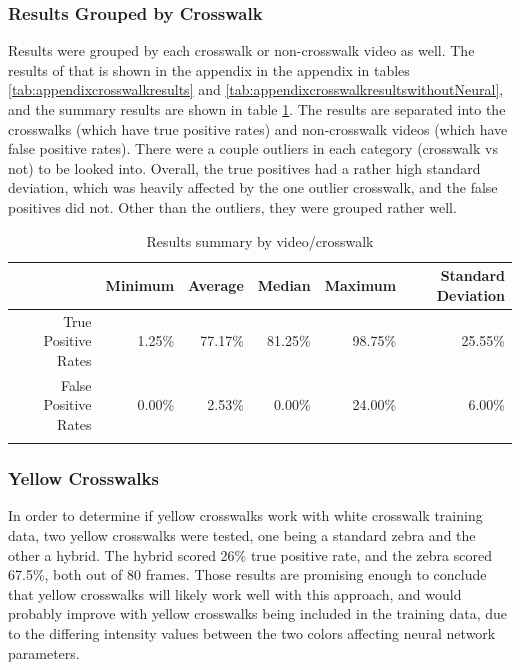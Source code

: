 \documentclass[12pt]{ucthesis}
\begin{document}
\subsubsection{Results Grouped by Crosswalk}

Results were grouped by each crosswalk or non-crosswalk video as well. The results of that is shown in the appendix in the appendix in tables \ref{tab:appendixcrosswalkresults} and \ref{tab:appendixcrosswalkresultswithoutNeural}, and the summary results are shown in table \ref{tab:crosswalkResultsSummary}. The results are separated into the crosswalks (which have true positive rates) and non-crosswalk videos (which have false positive rates).  There were a couple outliers in each category (crosswalk vs not) to be looked into. Overall, the true positives had a rather high standard deviation, which was heavily affected by the one outlier crosswalk, and the false positives did not. Other than the outliers, they were grouped rather well.

\begin{center}
    \begin{longtable}[H]{|r|r|r|r|r|r|}
    \cline{2-6}    \multicolumn{1}{r|}{} & Minimum & Average & Median & Maximum & Standard Deviation \bigstrut\\
    \hline
    True Positive Rates & 1.25\% & 77.17\% & 81.25\% & 98.75\% & 25.55\% \bigstrut\\
    \hline
    False Positive Rates & 0.00\% & 2.53\% & 0.00\% & 24.00\% & 6.00\% \bigstrut\\
    \hline


    \caption{Results summary by video/crosswalk}
    \label{tab:crosswalkResultsSummary} 
    \end{longtable}
\end{center}

\subsubsection{Yellow Crosswalks}

In order to determine if yellow crosswalks work with white crosswalk training data, two yellow crosswalks were tested, one being a standard zebra and the other a hybrid. The hybrid scored 26\% true positive rate, and the zebra scored 67.5\%, both out of 80 frames. Those results are promising enough to conclude that yellow crosswalks will likely work well with this approach, and would probably improve with yellow crosswalks being included in the training data, due to the differing intensity values between the two colors affecting neural network parameters. 
\end{document}
